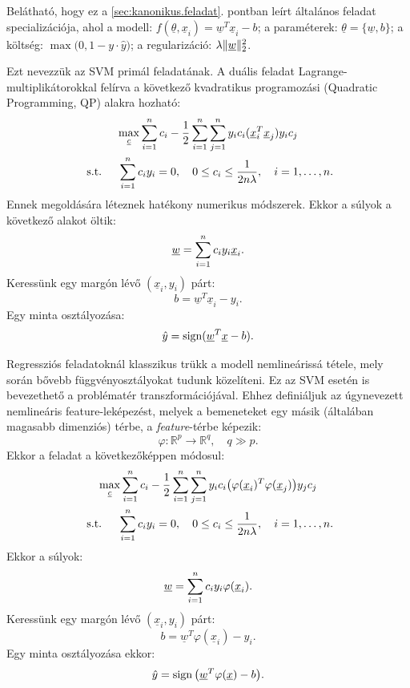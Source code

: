 Belátható, hogy ez a \ref{sec:kanonikus.feladat}. pontban leírt általános feladat specializációja, ahol a modell: $ f(\underline{\theta}, \underline{x}_i) = \underline{w}^T \underline{x}_i - b $; a paraméterek: $ \underline{\theta} = \{\underline{w}, b\} $; a költség: $ \max\big(0, 1 - y \cdot\hat{y}) $; a regularizáció: $ \lambda \lVert\underline{w}\rVert_2^2 $.


Ezt nevezzük az SVM primál feladatának. A duális feladat Lagrange-multiplikátorokkal felírva a következő kvadratikus programozási (Quadratic Programming, QP) alakra hozható:
\begin{multline*}
\max\limits_{\underline{c}} \sum\limits_{i=1}^{n}c_i -  
\frac{1}{2}\sum\limits_{{i}=1}^{n}\sum\limits_{{j}=1}^{n} y_i c_i (\underline{x}_i^T \underline{x}_j) y_i c_j \\
\text{ s.t. } \quad 
\sum\limits_{{i}=1}^{n} c_i y_i = 0, \quad
0 \leq c_i \leq \frac{1}{2n\lambda}, \quad 
i=1,\dots,n.
\end{multline*}
Ennek megoldására léteznek hatékony numerikus módszerek.
Ekkor a súlyok a következő alakot öltik:
\[
\underline{w} = \sum\limits_{{i}=1}^{n} c_i y_i \underline{x}_i.
\]
Keressünk egy margón lévő $ (\underline{x}_i, y_i) $ párt:
\[
b = \underline{w}^T \underline{x}_i  - y_i.
\]
Egy minta osztályozása:
\[
\hat{y} = \operatorname{sign}(\underline{w}^T \underline{x} - b).
\]






Regressziós feladatoknál klasszikus trükk a modell nemlineárissá tétele, mely során bővebb függvényosztályokat tudunk közelíteni. Ez az SVM esetén is bevezethető a problématér 
transzformációjával.
Ehhez definiáljuk az úgynevezett nemlineáris feature-leképezést, melyek a bemeneteket egy másik (általában magasabb dimenziós) térbe,
a \textit{feature}-térbe képezik:
\[
\varphi\colon \mathbb{R}^p \rightarrow \mathbb{R}^q, \quad q \gg p.
\]
Ekkor a feladat a következőképpen módosul:
\begin{multline*}
\max\limits_{\underline{c}} \sum\limits_{i=1}^{n}c_i - 
\frac{1}{2}\sum\limits_{{i}=1}^{n}\sum\limits_{{j}=1}^{n} y_i c_i \big(\varphi(\underline{x}_i)^T \varphi(\underline{x}_j)\big) y_j c_j \\
\text{ s.t. } \quad 
\sum\limits_{{i}=1}^{n} c_i y_i = 0, \quad
0 \leq c_i \leq \frac{1}{2n\lambda}, \quad 
i=1,\dots,n.
\end{multline*}
Ekkor a súlyok:
\[
\underline{w} = \sum\limits_{{i}=1}^{n} c_i y_i \varphi(\underline{x}_i).
\]
Keressünk egy margón lévő $ (\underline{x}_i, y_i) $ párt:
\[
b = \underline{w}^T \varphi(\underline{x}_i)  - y_i.
\]
Egy minta osztályozása ekkor:
\[
\hat{y} = \operatorname{sign} \big(\underline{w}^T \varphi(\underline{x}) - b\big).
\]


